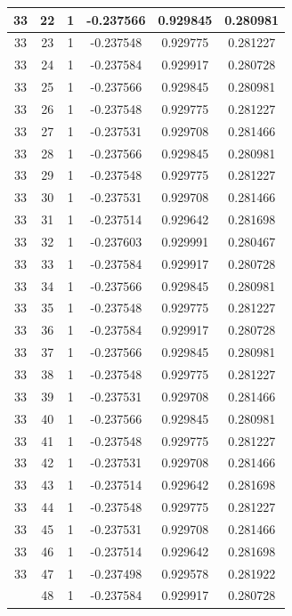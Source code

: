\documentclass[12pt,a4paper]{article}
\numberwithin{equation}{section}
\numberwithin{figure}{section}
\numberwithin{table}{section}
\begin{document}
\begin{longtable}{|c|c|c|c|c|c|}
33 & 22 & 1 & -0.237566 & 0.929845 & 0.280981 \\ \hline
33 & 23 & 1 & -0.237548 & 0.929775 & 0.281227 \\ \hline
33 & 24 & 1 & -0.237584 & 0.929917 & 0.280728 \\ \hline
33 & 25 & 1 & -0.237566 & 0.929845 & 0.280981 \\ \hline
33 & 26 & 1 & -0.237548 & 0.929775 & 0.281227 \\ \hline
33 & 27 & 1 & -0.237531 & 0.929708 & 0.281466 \\ \hline
33 & 28 & 1 & -0.237566 & 0.929845 & 0.280981 \\ \hline
33 & 29 & 1 & -0.237548 & 0.929775 & 0.281227 \\ \hline
33 & 30 & 1 & -0.237531 & 0.929708 & 0.281466 \\ \hline
33 & 31 & 1 & -0.237514 & 0.929642 & 0.281698 \\ \hline
33 & 32 & 1 & -0.237603 & 0.929991 & 0.280467 \\ \hline
33 & 33 & 1 & -0.237584 & 0.929917 & 0.280728 \\ \hline
33 & 34 & 1 & -0.237566 & 0.929845 & 0.280981 \\ \hline
33 & 35 & 1 & -0.237548 & 0.929775 & 0.281227 \\ \hline
33 & 36 & 1 & -0.237584 & 0.929917 & 0.280728 \\ \hline
33 & 37 & 1 & -0.237566 & 0.929845 & 0.280981 \\ \hline
33 & 38 & 1 & -0.237548 & 0.929775 & 0.281227 \\ \hline
33 & 39 & 1 & -0.237531 & 0.929708 & 0.281466 \\ \hline
33 & 40 & 1 & -0.237566 & 0.929845 & 0.280981 \\ \hline
33 & 41 & 1 & -0.237548 & 0.929775 & 0.281227 \\ \hline
33 & 42 & 1 & -0.237531 & 0.929708 & 0.281466 \\ \hline
33 & 43 & 1 & -0.237514 & 0.929642 & 0.281698 \\ \hline
33 & 44 & 1 & -0.237548 & 0.929775 & 0.281227 \\ \hline
33 & 45 & 1 & -0.237531 & 0.929708 & 0.281466 \\ \hline
33 & 46 & 1 & -0.237514 & 0.929642 & 0.281698 \\ \hline
33 & 47 & 1 & -0.237498 & 0.929578 & 0.281922 \\ \hline
\pagebreak
33 & 48 & 1 & -0.237584 & 0.929917 & 0.280728 \\ \hline

\end{longtable}
\end{document}
